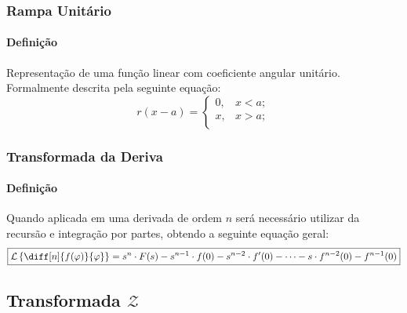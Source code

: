 \documentclass{article}
\begin{document}
\subsubsection{Rampa Unitário}
    \paragraph{Definição}Representação de uma função linear com coeficiente angular unitário. Formalmente descrita pela seguinte equação:
    \begin{equation}
        \boxed{
            r(x - a) = 
            \begin{cases}
                0, & x < a;\\
                x, & x > a;\\
            \end{cases}
        }
    \end{equation}

\subsubsection{Transformada da Deriva}
    \paragraph{Definição}Quando aplicada em uma derivada de ordem $n$ será necessário utilizar da recursão e integração por partes, obtendo a seguinte equação geral:
    \begin{equation}
        \boxed{
            \mathcal{L}\left\{\diff[n]{f(\varphi)}{\varphi}\right\} = 
            s^{n}\cdot F(s) - 
            s^{n-1} \cdot f(0) - 
            s^{n-2} \cdot f'(0) - \dots - 
            s \cdot f^{n-2}(0) - 
            f^{n-1}(0)
        }
    \end{equation}
\newpage

\subsection{Transformada $\mathcal{Z}$}
\end{document}
